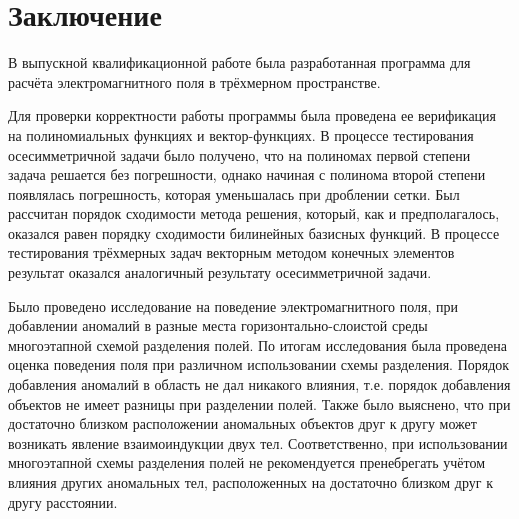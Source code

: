 \chapter*{Заключение}


В выпускной квалификационной работе была разработанная программа для расчёта электромагнитного поля в трёхмерном пространстве. 

Для проверки корректности работы программы была проведена ее верификация на полиномиальных функциях и вектор-функциях. В процессе тестирования осесимметричной задачи было получено, что на полиномах первой степени задача решается без погрешности, однако начиная с полинома второй степени появлялась погрешность, которая уменьшалась при дроблении сетки. Был рассчитан порядок сходимости метода решения, который, как и предполагалось, оказался равен порядку сходимости билинейных базисных функций. В процессе тестирования трёхмерных задач векторным методом конечных элементов результат оказался аналогичный результату осесимметричной задачи. 

Было проведено исследование на поведение электромагнитного поля, при добавлении аномалий в разные места горизонтально-слоистой среды многоэтапной схемой разделения полей. По итогам исследования была проведена оценка поведения поля при различном использовании схемы разделения. Порядок добавления аномалий в область не дал никакого влияния, т.е. порядок добавления объектов не имеет разницы при разделении полей. Также было выяснено, что при достаточно близком расположении аномальных объектов друг к другу может возникать явление взаимоиндукции двух тел. Соответственно, при использовании многоэтапной схемы разделения полей не рекомендуется пренебрегать учётом влияния других аномальных тел, расположенных на достаточно близком друг к другу расстоянии.
